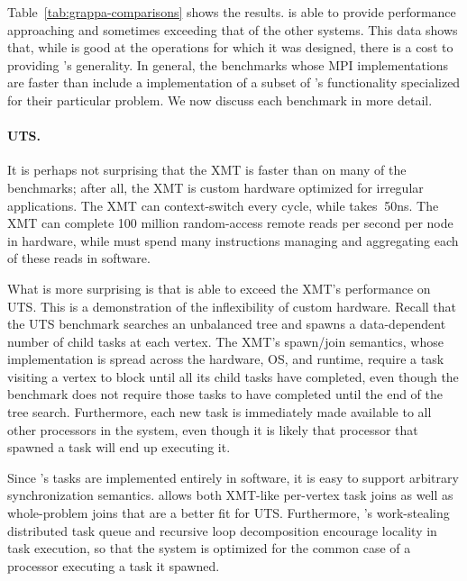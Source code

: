 Table~\ref{tab:grappa-comparisons} shows the results. \Grappa is able
to provide performance approaching and sometimes exceeding that of the
other systems. This data shows that, while \Grappa is good at the
operations for which it was designed, there is a cost to providing
\Grappa's generality. In general, the benchmarks whose MPI
implementations are faster than \Grappa include a implementation of a
subset of \Grappa's functionality specialized for their particular
problem. We now discuss each benchmark in more detail.

\paragraph{UTS.}
It is perhaps not surprising that the XMT is faster than
\Grappa on many of the benchmarks; after all, the XMT is custom
hardware optimized for irregular applications. The XMT can
context-switch every cycle, while \Grappa takes $~$50ns. The XMT can
complete 100 million random-access remote reads per second per node in
hardware, while \Grappa must spend many instructions managing and
aggregating each of these reads in software.

What is more surprising is that \Grappa is able to exceed the XMT's
performance on UTS. This is a demonstration of the inflexibility of
custom hardware. Recall that the UTS benchmark searches an unbalanced
tree and spawns a data-dependent number of child tasks at each
vertex. The XMT's spawn/join semantics, whose implementation is spread
across the hardware, OS, and runtime, require a task visiting a vertex
to block until all its child tasks have completed, even though the
benchmark does not require those tasks to have completed until the end
of the tree search. Furthermore, each new task is immediately made
available to all other processors in the system, even though it is
likely that processor that spawned a task will end up executing it.

Since \Grappa's tasks are implemented entirely in software, it is easy
to support arbitrary synchronization semantics. \Grappa allows both
XMT-like per-vertex task joins as well as whole-problem joins that are
a better fit for UTS\@. Furthermore, \Grappa's work-stealing distributed
task queue and recursive loop decomposition encourage locality in task
execution, so that the system is optimized for the common case of a
processor executing a task it spawned.


